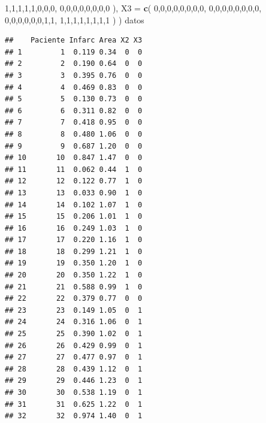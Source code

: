 \documentclass[
]{book}
\newenvironment{Shaded}{\begin{snugshade}}{\end{snugshade}}
\newcommand{\AttributeTok}[1]{\textcolor[rgb]{0.13,0.29,0.53}{#1}}
\newcommand{\DecValTok}[1]{\textcolor[rgb]{0.00,0.00,0.81}{#1}}
\newcommand{\FunctionTok}[1]{\textcolor[rgb]{0.13,0.29,0.53}{\textbf{#1}}}
\newcommand{\NormalTok}[1]{#1}
\begin{document}
\begin{Shaded}
\begin{Highlighting}[]
    \DecValTok{1}\NormalTok{,}\DecValTok{1}\NormalTok{,}\DecValTok{1}\NormalTok{,}\DecValTok{1}\NormalTok{,}\DecValTok{1}\NormalTok{,}\DecValTok{0}\NormalTok{,}\DecValTok{0}\NormalTok{,}\DecValTok{0}\NormalTok{,}
    \DecValTok{0}\NormalTok{,}\DecValTok{0}\NormalTok{,}\DecValTok{0}\NormalTok{,}\DecValTok{0}\NormalTok{,}\DecValTok{0}\NormalTok{,}\DecValTok{0}\NormalTok{,}\DecValTok{0}\NormalTok{,}\DecValTok{0}
\NormalTok{  ),}
  \AttributeTok{X3 =} \FunctionTok{c}\NormalTok{(}
    \DecValTok{0}\NormalTok{,}\DecValTok{0}\NormalTok{,}\DecValTok{0}\NormalTok{,}\DecValTok{0}\NormalTok{,}\DecValTok{0}\NormalTok{,}\DecValTok{0}\NormalTok{,}\DecValTok{0}\NormalTok{,}\DecValTok{0}\NormalTok{,}
    \DecValTok{0}\NormalTok{,}\DecValTok{0}\NormalTok{,}\DecValTok{0}\NormalTok{,}\DecValTok{0}\NormalTok{,}\DecValTok{0}\NormalTok{,}\DecValTok{0}\NormalTok{,}\DecValTok{0}\NormalTok{,}\DecValTok{0}\NormalTok{,}
    \DecValTok{0}\NormalTok{,}\DecValTok{0}\NormalTok{,}\DecValTok{0}\NormalTok{,}\DecValTok{0}\NormalTok{,}\DecValTok{0}\NormalTok{,}\DecValTok{0}\NormalTok{,}\DecValTok{1}\NormalTok{,}\DecValTok{1}\NormalTok{,}
    \DecValTok{1}\NormalTok{,}\DecValTok{1}\NormalTok{,}\DecValTok{1}\NormalTok{,}\DecValTok{1}\NormalTok{,}\DecValTok{1}\NormalTok{,}\DecValTok{1}\NormalTok{,}\DecValTok{1}\NormalTok{,}\DecValTok{1}
\NormalTok{  )}
\NormalTok{)}
\NormalTok{datos}
\end{Highlighting}
\end{Shaded}

\begin{verbatim}
##    Paciente Infarc Area X2 X3
## 1         1  0.119 0.34  0  0
## 2         2  0.190 0.64  0  0
## 3         3  0.395 0.76  0  0
## 4         4  0.469 0.83  0  0
## 5         5  0.130 0.73  0  0
## 6         6  0.311 0.82  0  0
## 7         7  0.418 0.95  0  0
## 8         8  0.480 1.06  0  0
## 9         9  0.687 1.20  0  0
## 10       10  0.847 1.47  0  0
## 11       11  0.062 0.44  1  0
## 12       12  0.122 0.77  1  0
## 13       13  0.033 0.90  1  0
## 14       14  0.102 1.07  1  0
## 15       15  0.206 1.01  1  0
## 16       16  0.249 1.03  1  0
## 17       17  0.220 1.16  1  0
## 18       18  0.299 1.21  1  0
## 19       19  0.350 1.20  1  0
## 20       20  0.350 1.22  1  0
## 21       21  0.588 0.99  1  0
## 22       22  0.379 0.77  0  0
## 23       23  0.149 1.05  0  1
## 24       24  0.316 1.06  0  1
## 25       25  0.390 1.02  0  1
## 26       26  0.429 0.99  0  1
## 27       27  0.477 0.97  0  1
## 28       28  0.439 1.12  0  1
## 29       29  0.446 1.23  0  1
## 30       30  0.538 1.19  0  1
## 31       31  0.625 1.22  0  1
## 32       32  0.974 1.40  0  1
\end{verbatim}
\end{document}
